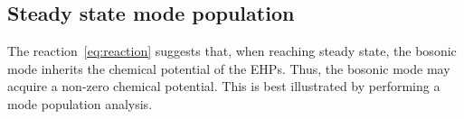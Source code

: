\documentclass[aps,prb,
,floatfix,footinbib,shortbibliography,
preprint
]{revtex4-1}
\begin{document}

\subsection{Steady state mode population}
The reaction~\ref{eq:reaction} suggests that, when reaching steady state, the bosonic mode inherits the chemical potential of the EHPs. Thus, the bosonic mode may acquire a non-zero chemical potential. This is best illustrated by performing a mode population analysis. 
\end{document}
